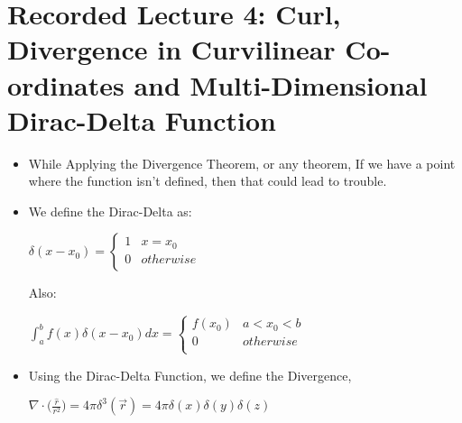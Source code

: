 \documentclass{article}
\begin{document}
\section{Recorded Lecture 4: Curl, Divergence in Curvilinear Co-ordinates and Multi-Dimensional Dirac-Delta Function}

\begin{itemize}
  \item While Applying the Divergence Theorem, or any theorem, If we have a point where the function isn't defined, then that could lead to trouble.
  \item We define the Dirac-Delta as: \\
  \begin{center}
    $  \delta (x-x_0) = \begin{cases}
                      1 & x = x_0 \\
                      0 & otherwise \\
                  \end{cases}$
  \end{center}

  Also: \\
  \begin{center}
    $  \int_{a}^{b}{f(x) \delta (x-x_0) dx} = \begin{cases}
                      f(x_0) & a < x_0 < b \\
                      0 & otherwise \\
                  \end{cases}$
  \end{center}

  \item Using the Dirac-Delta Function, we define the Divergence,
  \begin{center}
    $ \nabla \cdot \big( \frac{\hat{r}}{r^2} \big) = 4 \pi \delta ^{3} (\vec{r}) = 4 \pi \delta (x) \delta (y) \delta (z)$
  \end{center}


\end{itemize}
\end{document}
